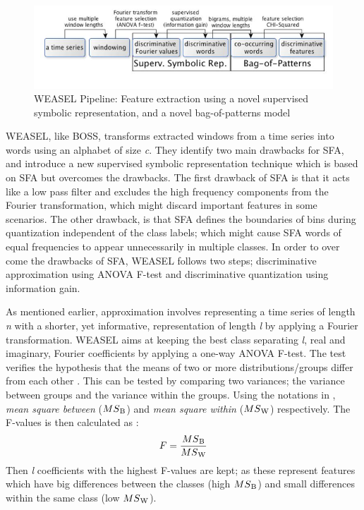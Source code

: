 \begin{figure}
    \captionsetup{justification=raggedright}
    \centering
    \includegraphics[scale = 0.5]{WEASELFlow.JPG}
    \centering
    \caption{WEASEL Pipeline: Feature extraction using a novel supervised symbolic representation, and a novel bag-of-patterns model \cite{schafer2017fast}}
    \label{Img:WEASELFlow}
\end{figure}

WEASEL, like BOSS, transforms extracted windows from a time series into words using an alphabet of size \emph{c}.
They identify two main drawbacks for SFA, and introduce a new supervised symbolic representation technique which is based on SFA but overcomes the drawbacks.
The first drawback of SFA is that it acts like a low pass filter and excludes the high frequency components from the Fourier transformation,
which might discard important features in some scenarios. The other drawback, is that SFA defines the boundaries of bins during quantization
independent of the class labels; which might cause SFA words of equal frequencies to appear unnecessarily in multiple classes.
In order to over come the drawbacks of SFA, WEASEL follows two steps;
discriminative approximation using ANOVA F-test and discriminative quantization using information gain.

As mentioned earlier, approximation involves representing a time series of length \emph{n} with a shorter, yet informative, representation of length \emph{l} by applying a Fourier transformation.
WEASEL aims at keeping the best class separating \emph{l}, real and imaginary, Fourier coefficients by applying a one-way ANOVA F-test.
The test verifies the hypothesis that the means of two or more distributions/groups differ from each other \cite{lowry2014concepts}.
This can be tested by comparing two variances; the variance between groups and the variance within the groups.
Using the notations in \cite{schafer2017fast}, \emph{mean square between} ($MS\textsubscript{B}$) and \emph{mean square within} ($MS\textsubscript{W}$) respectively.
The F-values is then calculated as :
\begin{equation}
    F= \frac{MS\textsubscript{B}}{MS\textsubscript{W}}
\end{equation}
Then \emph{l} coefficients with the highest F-values are kept; as these represent features which have big differences between the classes (high $MS\textsubscript{B}$) and
small differences within the same class (low $MS\textsubscript{W}$).


